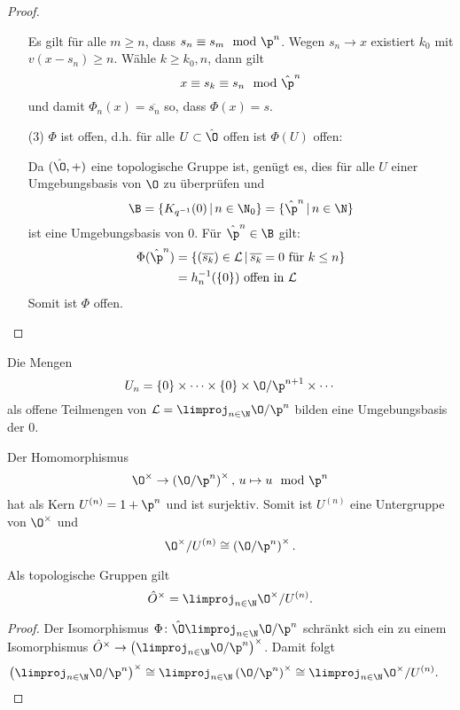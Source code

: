 \begin{proof}
\begin{itemize}
Es gilt für alle $m\geq n$, dass $s_n \equiv s_m \mod \p^n$. Wegen $s_n\to x$ existiert $k_0$ mit $v(x-s_n) \geq n$. Wähle $k\geq k_0,n$, dann gilt
\[ x \equiv s_k \equiv s_n \mod \hat{\p}^n
\]
und damit $\Phi_n(x)= \overline{s_n}$ so, dass $\Phi(x)=s$.
\item[(3)] $\Phi$ ist offen, d.h. für alle $U\subset \hat{\O}$ offen ist $\Phi(U)$ offen:

Da $(\hat{\O},+)$ eine topologische Gruppe ist, genügt es, dies für alle $U$ einer Umgebungsbasis von $\O$ zu überprüfen und
\[ \B = \{ K_{q^{-1}}(0) \,|\, n \in \N_0\}
= \{ \hat{\p}^n \,|\, n \in \N \}
\]
ist eine Umgebungsbasis von $0$. Für $\hat{\p}^n \in \B$ gilt:
\begin{align*}
\Phi(\hat{\p}^n)
&= \{ (\overline{s_k}) \in \mathcal{L} \,|\, \overline{s_k}=0 \text{ für } k\leq n  \} \\
&= h_n^{-1} ( \{0\}) \text{ offen in } \mathcal{L}
\end{align*}
Somit ist $\Phi$ offen.
\end{itemize}
\end{proof}


\begin{Bem}
Die Mengen
\[ U_n = \{0\} \times \cdots \times \{0\} \times \O / \p^{n+1} \times \cdots
\]
als offene Teilmengen von $\mathcal{L} = \limproj_{n\in\N} \O/\p^n$ bilden eine Umgebungsbasis der $0$.
\end{Bem}


\begin{Bem}
Der Homomorphismus 
\[ \O^\times \to \left( \O / \p^n \right)^\times, \, u \mapsto u \mod \p^n 
\]
hat als Kern $U^{(n)} = 1+\p^n$ und ist surjektiv. Somit ist $U^{(n)}$ eine Untergruppe von $\O^\times$ und
\[ \O^\times / U^{(n)} \cong \left( \O / \p^n \right)^\times.
\]
\end{Bem}

\begin{Kor}
Als topologische Gruppen gilt
\[ \hat{O}^\times = \limproj_{n\in\N} \O^\times / U^{(n)} .
\]
\end{Kor}

\begin{proof}
Der Isomorphismus $\Phi \colon \hat{\O} \limproj_{n\in\N} \O/\p^n$ schränkt sich ein zu einem Isomorphismus $\hat{O}^\times \to \left(  \limproj_{n\in\N} \O/\p^n\right)^\times$. Damit folgt
\begin{align*}
\left(  \limproj_{n\in\N} \O/\p^n\right)^\times
&\cong  \limproj_{n\in\N} \left(  \O/\p^n\right)^\times
\cong \limproj_{n\in\N} \O^\times / U^{(n)} .
\end{align*}
\end{proof}

